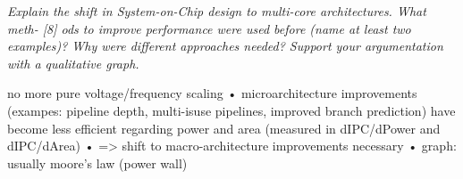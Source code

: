 \documentclass[fontsize=8pt]{scrartcl}
\begin{document}
\begin{multicols*}{4}
\textit{Explain the shift in System-on-Chip design to multi-core architectures. What meth- [8]
ods to improve performance were used before (name at least two examples)? Why were
different approaches needed? Support your argumentation with a qualitative graph.}

no more pure voltage/frequency scaling
• microarchitecture improvements (exampes: pipeline depth, multi-isuse pipelines,
improved branch prediction) have become less efficient regarding power and
area (measured in dIPC/dPower and dIPC/dArea)
• => shift to macro-architecture improvements necessary
• graph: usually moore’s law (power wall)




\end{multicols*}
\end{document}
